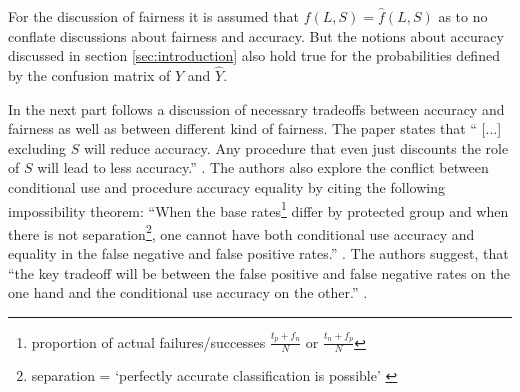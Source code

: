 
For the discussion of fairness it is assumed that $f(L,S) = \hat{f}(L,S)$ as to no 
conflate discussions about fairness and accuracy. But the notions about accuracy discussed 
in section \ref{sec:introduction} also hold true for the probabilities defined by the
confusion matrix of $Y$ and $\hat{Y}$. 

In the next part follows a discussion of necessary tradeoffs between accuracy and 
fairness as well as between different kind of fairness. The paper states that \enquote{
[...] excluding $S$ will reduce accuracy. Any procedure that even just discounts the role 
of $S$ will lead to less accuracy.} \cite{Berk.2018}. The authors also explore the conflict 
between conditional use and procedure accuracy equality by citing the following impossibility 
theorem: \enquote{When the base rates\footnote{ proportion of actual failures/successes 
$\frac{t_p + f_n}{N}$ or $\frac{t_n + f_p}{N}$} differ by protected group and when there 
is not separation\footnote{ separation = \enquote{perfectly accurate classification is
possible} \cite{Berk.2018}}, one cannot have both conditional use accuracy and equality in 
the false negative and false positive rates.} \cite{Chouldechova2017FairPW, DBLP:journals/corr/KleinbergMR16}. The authors suggest, that \enquote{the key tradeoff will be 
between the false positive and false negative rates on the one hand and the conditional use 
accuracy on the other.} \cite{Berk.2018}.

